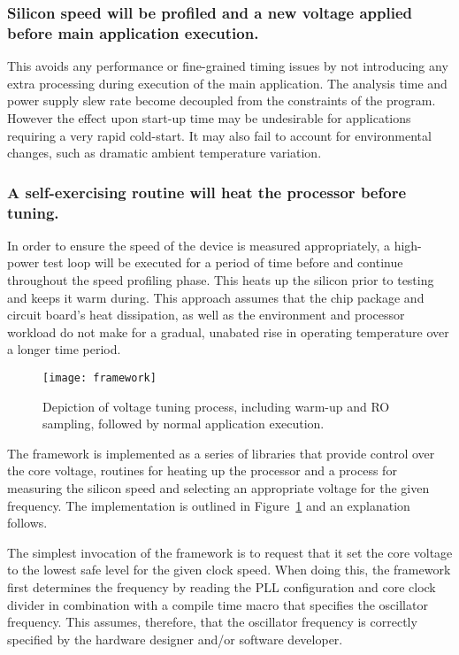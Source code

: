 \documentclass[a4paper,twocolumn,DIV=16]{scrartcl}
\begin{document}
\subsubsection*{Silicon speed will be profiled and a new voltage applied before
main application execution.}

This avoids any performance or fine-grained timing issues by not introducing any
extra processing during execution of the main application. The analysis time and
power supply slew rate become decoupled from the constraints of the program.
However the effect upon start-up time may be undesirable for applications
requiring a very rapid cold-start. It may also fail to account for environmental
changes, such as dramatic ambient temperature variation.

\subsubsection*{A self-exercising routine will heat the processor before
tuning.}

In order to ensure the speed of the device is measured appropriately, a
high-power test loop will be executed for a period of time before and continue
throughout the speed profiling phase. This heats up the silicon prior to testing
and keeps it warm during. This approach assumes that the chip package and
circuit board's heat dissipation, as well as the environment and processor
workload do not make for a gradual, unabated rise in operating temperature over
a longer time period.

\begin{figure}[htbp]
\centerline{\texttt{[image: framework]}}
\caption{Depiction of voltage tuning process, including warm-up and RO sampling,
followed by normal application execution.}
\label{fig:framework}
\end{figure}

The framework is implemented as a series of libraries that provide control over
the core voltage, routines for heating up the processor and a process for
measuring the silicon speed and selecting an appropriate voltage for the given
frequency. The implementation is outlined in Figure~\ref{fig:framework} and
an explanation follows.

The simplest invocation of the framework is to request that it set the core
voltage to the lowest safe level for the given clock speed. When doing this, the
framework first determines the frequency by reading the PLL configuration and
core clock divider in combination with a compile time macro that specifies the
oscillator frequency. This assumes, therefore, that the oscillator frequency is
correctly specified by the hardware designer and/or software developer.
\end{document}
